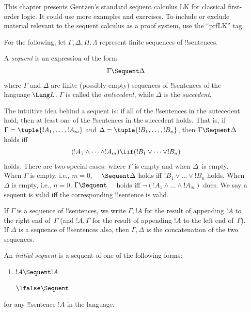 
\begin{editorial}
  This chapter presents Gentzen's standard sequent calculus LK for
  classical first-order logic.  It could use more examples and
  exercises. To include or exclude material relevant to the sequent
  calculus as a proof system, use the ``prfLK'' tag.
\end{editorial}





For the following, let $\Gamma, \Delta, \Pi, \Lambda$ represent finite
sequences of !!{sentence}s.

\begin{defn}[Sequent]
A \emph{sequent} is an expression of the form
\[
\Gamma \Sequent \Delta
\]
where $\Gamma$ and $\Delta$ are finite (possibly empty) sequences of
!!{sentence}s of the language $\Lang L$. $\Gamma$ is called the
\emph{antecedent}, while $\Delta$ is the \emph{succedent}.
\end{defn}

\begin{explain}
The intuitive idea behind a sequent is: if all of the !!{sentence}s in
the antecedent hold, then at least one of the !!{sentence}s in the
succedent holds. That is, if $\Gamma = \tuple{!A_1, \dots, !A_m}$ and
$\Delta = \tuple{!B_1, \dots, !B_n}$, then $\Gamma \Sequent \Delta$
holds iff
\[
(!A_1 \land \cdots \land !A_m) \lif (!B_1 \lor \cdots \lor
!B_n)
\]
holds. There are two special cases: where $\Gamma$ is empty and when
$\Delta$~is empty. When $\Gamma$ is empty, i.e., $m = 0$, $\quad
\Sequent \Delta$ holds iff $!B_1 \lor \dots \lor !B_n$ holds. When
$\Delta$ is empty, i.e., $n = 0$, $\Gamma \Sequent \quad$ holds iff
$\lnot(!A_1 \land \dots \land !A_m)$ does.  We say a sequent is valid
iff the corresponding !!{sentence} is valid.
\end{explain}

If $\Gamma$ is a sequence of !!{sentence}s, we write $\Gamma, !A$ for
the result of appending $!A$ to the right end of~$\Gamma$ (and $!A,
\Gamma$ for the result of appending $!A$ to the left end
of~$\Gamma$). If $\Delta$ is a sequence of !!{sentence}s also, then $\Gamma,
\Delta$ is the concatenation of the two sequences.

\begin{defn}
An \emph{initial sequent} is a sequent
of one of the following forms:
  \begin{enumerate}
    \item $!A \Sequent !A$
    
    $\lfalse \Sequent \quad$
  \end{enumerate} for any !!{sentence} $!A$ in the language.
\end{defn}

